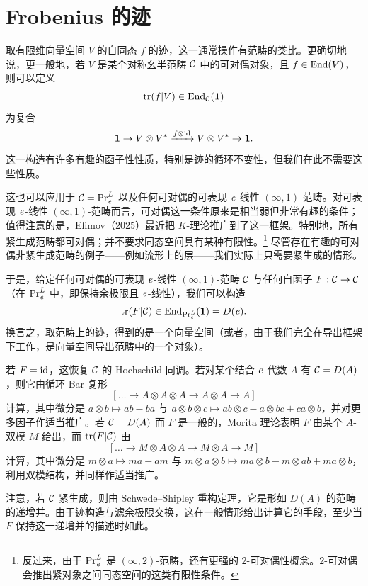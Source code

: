 \section{Frobenius 的迹}

取有限维向量空间 $V$ 的自同态 $f$ 的迹，这一通常操作有范畴的类比。更确切地说，更一般地，若 $V$ 是某个对称幺半范畴 $\mathcal{C}$ 中的可对偶对象，且 $f\in\operatorname{End}(V)$，则可以定义
\[ \operatorname{tr}(f|V)\in\operatorname{End}_{\mathcal{C}}(\mathbf{1}) \]
为复合
\[ \mathbf{1}\to V\otimes V^{*}\xrightarrow{f\otimes\mathrm{id}}V\otimes V^{*}\to\mathbf{1}. \]
这一构造有许多有趣的函子性性质，特别是迹的循环不变性，但我们在此不需要这些性质。

这也可以应用于 $\mathcal{C}=\mathrm{Pr}^{L}_{\mathit{e}}$ 以及任何可对偶的可表现 $\mathit{e}$-线性 $(\infty,1)$-范畴。对可表现 $\mathit{e}$-线性 $(\infty,1)$-范畴而言，可对偶这一条件原来是相当弱但非常有趣的条件；值得注意的是，Efimov（2025）最近把 $K$-理论推广到了这一框架。特别地，所有紧生成范畴都可对偶；并不要求同态空间具有某种有限性。\footnote{反过来，由于 $\mathrm{Pr}^{L}_{\mathit{e}}$ 是 $(\infty,2)$-范畴，还有更强的 $2$-可对偶性概念。$2$-可对偶会推出紧对象之间同态空间的这类有限性条件。} 尽管存在有趣的可对偶非紧生成范畴的例子——例如流形上的层——我们实际上只需要紧生成的情形。

于是，给定任何可对偶的可表现 $\mathit{e}$-线性 $(\infty,1)$-范畴 $\mathcal{C}$ 与任何自函子 $F:\mathcal{C}\to\mathcal{C}$（在 $\mathrm{Pr}^{L}_{\mathit{e}}$ 中，即保持余极限且 $\mathit{e}$-线性），我们可以构造
\[ \operatorname{tr}(F|\mathcal{C})\in\operatorname{End}_{\mathrm{Pr}^{L}_{\mathit{e}}}(\mathbf{1})=D(\mathit{e}). \]
换言之，取范畴上的迹，得到的是一个向量空间（或者，由于我们完全在导出框架下工作，是向量空间导出范畴中的一个对象）。

\begin{example}
若 $F=\mathrm{id}$，这恢复 $\mathcal{C}$ 的 Hochschild 同调。若对某个结合 $\mathit{e}$-代数 $A$ 有 $\mathcal{C}=D(A)$，则它由循环 Bar 复形
\[ [\dots\to A\otimes A\otimes A\to A\otimes A\to A] \]
计算，其中微分是 $a\otimes b\mapsto ab-ba$ 与 $a\otimes b\otimes c\mapsto ab\otimes c-a\otimes bc+ca\otimes b$，并对更多因子作适当推广。若 $\mathcal{C}=D(A)$ 而 $F$ 是一般的，Morita 理论表明 $F$ 由某个 $A$-双模 $M$ 给出，而 $\operatorname{tr}(F|\mathcal{C})$ 由
\[ [\dots\to M\otimes A\otimes A\to M\otimes A\to M] \]
计算，其中微分是 $m\otimes a\mapsto ma-am$ 与 $m\otimes a\otimes b\mapsto ma\otimes b-m\otimes ab+ma\otimes b$，利用双模结构，并同样作适当推广。
\end{example}

注意，若 $\mathcal{C}$ 紧生成，则由 Schwede--Shipley 重构定理，它是形如 $D(A)$ 的范畴的递增并。由于迹构造与滤余极限交换，这在一般情形给出计算它的手段，至少当 $F$ 保持这一递增并的描述时如此。

